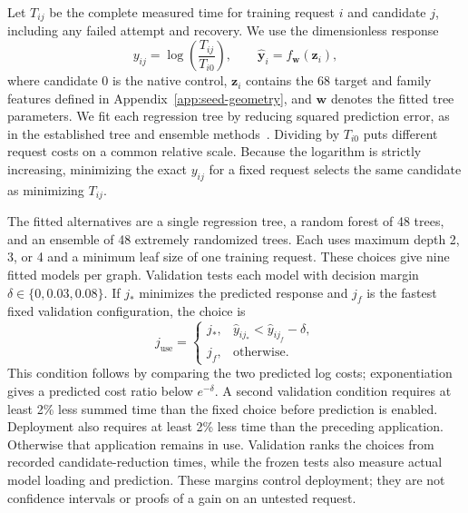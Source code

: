 Let $T_{ij}$ be the complete measured time for training request $i$ and candidate $j$, including any failed attempt and recovery. We use the dimensionless response
\begin{equation}
 y_{ij}=\log\!\left(\frac{T_{ij}}{T_{i0}}\right),
 \qquad
 \widehat{\boldsymbol y}_i=f_{\boldsymbol w}(\boldsymbol z_i),
 \label{eq:joint-response}
\end{equation}
where candidate 0 is the native control, $\boldsymbol z_i$ contains the 68 target and family features defined in Appendix~\ref{app:seed-geometry}, and $\boldsymbol w$ denotes the fitted tree parameters. We fit each regression tree by reducing squared prediction error, as in the established tree and ensemble methods~\cite{CART1984,Breiman2001Forest,Geurts2006ExtraTrees}. Dividing by $T_{i0}$ puts different request costs on a common relative scale. Because the logarithm is strictly increasing, minimizing the exact $y_{ij}$ for a fixed request selects the same candidate as minimizing $T_{ij}$.

The fitted alternatives are a single regression tree, a random forest of 48 trees, and an ensemble of 48 extremely randomized trees. Each uses maximum depth 2, 3, or 4 and a minimum leaf size of one training request. These choices give nine fitted models per graph. Validation tests each model with decision margin $\delta\in\{0,0.03,0.08\}$. If $j_*$ minimizes the predicted response and $j_f$ is the fastest fixed validation configuration, the choice is
\begin{equation}
 j_{\mathrm{use}}=
 \begin{cases}
 j_*,&\widehat y_{ij_*}<\widehat y_{ij_f}-\delta,\\
 j_f,&\text{otherwise}.
 \end{cases}
 \label{eq:joint-choice}
\end{equation}
This condition follows by comparing the two predicted log costs; exponentiation gives a predicted cost ratio below $e^{-\delta}$. A second validation condition requires at least 2\% less summed time than the fixed choice before prediction is enabled. Deployment also requires at least 2\% less time than the preceding application. Otherwise that application remains in use. Validation ranks the choices from recorded candidate-reduction times, while the frozen tests also measure actual model loading and prediction. These margins control deployment; they are not confidence intervals or proofs of a gain on an untested request.

